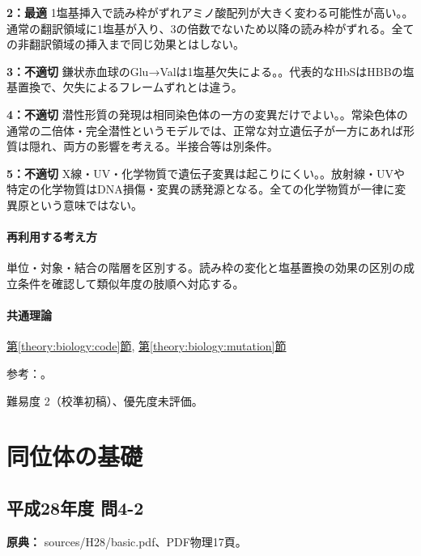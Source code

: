 \noindent\textbf{2：最適} 1塩基挿入で読み枠がずれアミノ酸配列が大きく変わる可能性が高い。。通常の翻訳領域に1塩基が入り、3の倍数でないため以降の読み枠がずれる。全ての非翻訳領域の挿入まで同じ効果とはしない。\par

\noindent\textbf{3：不適切} 鎌状赤血球のGlu→Valは1塩基欠失による。。代表的なHbSはHBBの塩基置換で、欠失によるフレームずれとは違う。\par

\noindent\textbf{4：不適切} 潜性形質の発現は相同染色体の一方の変異だけでよい。。常染色体の通常の二倍体・完全潜性というモデルでは、正常な対立遺伝子が一方にあれば形質は隠れ、両方の影響を考える。半接合等は別条件。\par

\noindent\textbf{5：不適切} X線・UV・化学物質で遺伝子変異は起こりにくい。。放射線・UVや特定の化学物質はDNA損傷・変異の誘発源となる。全ての化学物質が一律に変異原という意味ではない。\par

\paragraph{再利用する考え方} 単位・対象・結合の階層を区別する。読み枠の変化と塩基置換の効果の区別の成立条件を確認して類似年度の肢順へ対応する。

\paragraph{共通理論} \hyperref[theory:biology:code]{第\ref*{theory:biology:code}節}, \hyperref[theory:biology:mutation]{第\ref*{theory:biology:mutation}節}

\par 参考：\cite{nhgri_frameshift,nhgri_sickle}。

\par 難易度 2（校準初稿）、優先度未評価。

\section{同位体の基礎}

\subsection{平成28年度 問4-2}
\label{q:h28-reg-basic-4-2}

\noindent\textbf{原典：} sources/H28/basic.pdf、PDF物理17頁。

